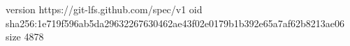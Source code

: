 version https://git-lfs.github.com/spec/v1
oid sha256:1e719f596ab5da29632267630462ae43f02e0179b1b392e65a7af62b8213ae06
size 4878
